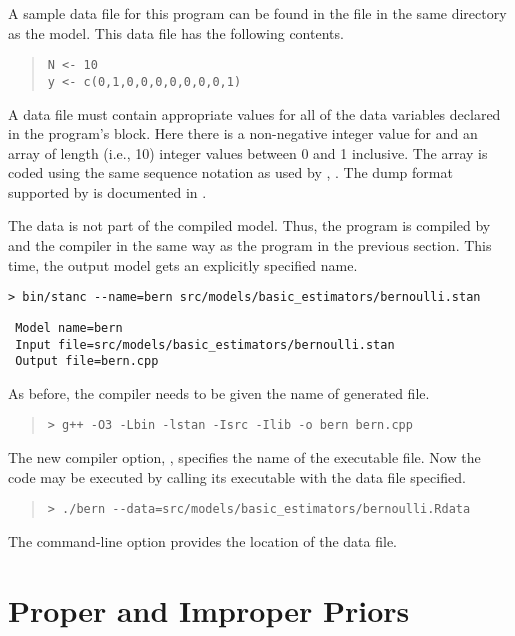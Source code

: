 A sample data file for this program can be found in the file
 in the same directory as the model.  This data file has
the following contents.
%
\begin{quote}
\begin{Verbatim}
N <- 10
y <- c(0,1,0,0,0,0,0,0,0,1)
\end{Verbatim}
\end{quote}
%
A data file must contain appropriate values for all of the data
variables declared in the \Stan program's  block.  Here there
is a non-negative integer value for  and an array of length
 (i.e., 10) integer values between 0 and 1 inclusive.  The
array is coded using the same sequence notation as used by \R,  .
The dump format supported by \Stan is documented in .

The data is not part of the compiled model.  Thus, the \Stan program
is compiled by \stanc and the \Cpp compiler in the same way as the
program in the previous section.  This time, the output model gets an
explicitly specified name.
%
%
\begin{center}
\begin{Verbatim}[fontshape=sl]
 > bin/stanc --name=bern src/models/basic_estimators/bernoulli.stan 
\end{Verbatim}
\begin{Verbatim}
 Model name=bern
 Input file=src/models/basic_estimators/bernoulli.stan
 Output file=bern.cpp
\end{Verbatim}
\end{center}
%
As before, the \Cpp compiler needs to be given the name of
generated file.
%
\begin{quote}
\begin{Verbatim}[fontshape=sl]
> g++ -O3 -Lbin -lstan -Isrc -Ilib -o bern bern.cpp
\end{Verbatim}
\end{quote}
%
The new compiler option, , specifies the name of the
executable file.  Now the code may be executed by calling its
executable with the data file specified.
%
\begin{quote}
\begin{Verbatim}[fontshape=sl]
> ./bern --data=src/models/basic_estimators/bernoulli.Rdata
\end{Verbatim}
\end{quote}
%
The command-line option  provides the location of the
data file.

\section{Proper and Improper Priors}

